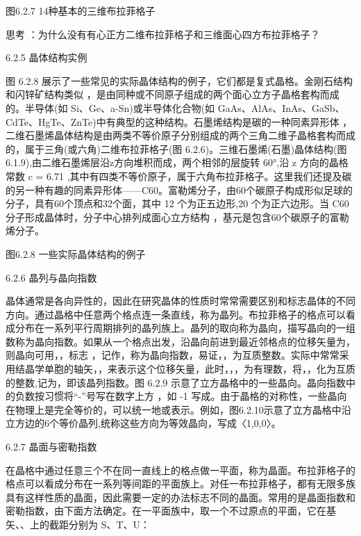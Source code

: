 图6.2.7 14种基本的三维布拉菲格子

思考 ：为什么没有有心正方二维布拉菲格子和三维面心四方布拉菲格子？



6.2.5 晶体结构实例

图 6.2.8 展示了一些常见的实际晶体结构的例子，它们都是复式晶格。金刚石结构和闪锌矿结构类似 ，是由同种或不同原子组成的两个面心立方子晶格套构而成的。半导体(如 Si、Ge、a-Sn)或半导体化合物(如 GaAs、AlAs、InAs、GaSb、CdTe、HgTe、ZnTe)中有典型的这种结构。石墨烯结构是碳的一种同素异形体 ，二维石墨烯晶体结构是由两类不等价原子分别组成的两个三角二维子晶格套构而成的，属于三角(或六角)二维布拉菲格子(图 6.2.6)。三维石墨烯(石墨)晶体结构(图 6.1.9),由二维石墨烯层沿z方向堆积而成，两个相邻的层旋转 60°,沿 z 方向的晶格常数 c = 6.71 ,其中有四类不等价原子，属于六角布拉菲格子。这里我们还提及碳的另一种有趣的同素异形体——C60。富勒烯分子，由60个碳原子构成形似足球的分子，具有60个顶点和32个面，其中 12 个为正五边形,20 个为正六边形。当 C60分子形成晶体时，分子中心排列成面心立方结构 ，基元是包含60个碳原子的富勒烯分子。



图6.2.8 一些实际晶体结构的例子



6.2.6 晶列与晶向指数

晶体通常是各向异性的，因此在研究晶体的性质时常常需要区别和标志晶体的不同方向。通过晶格中任意两个格点连一条直线，称为晶列。布拉菲格子的格点可以看成分布在一系列平行周期排列的晶列族上。晶列的取向称为晶向，描写晶向的一组数称为晶向指数。如果从一个格点出发，沿晶向前进到最近邻格点的位移矢量为，则晶向可用，，标志 ，记作，称为晶向指数，易证，，为互质整数。实际中常常采用结晶学单胞的轴矢，，来表示这个位移矢量，此时，，，为有理数，将，，化为互质的整数,记为，即该晶列指数。图 6.2.9 示意了立方晶格中的一些晶向。晶向指数中的负数按习惯将“-”号写在数字上方 ，如 -1 写成。由于晶格的对称性，一些晶向在物理上是完全等价的，可以统一地或表示。例如，图6.2.10示意了立方晶格中沿立方边的6个等价晶列,统称这些方向为等效晶向，写成〈1,0,0〉。





6.2.7 晶面与密勒指数

在晶格中通过任意三个不在同一直线上的格点做一平面，称为晶面。布拉菲格子的格点可以看成分布在一系列等间距的平面族上。对任一布拉菲格子，都有无限多族具有这样性质的晶面，因此需要一定的办法标志不同的晶面。常用的是晶面指数和密勒指数，由下面方法确定。在一平面族中，取一个不过原点的平面，它在基矢、、上的截距分别为 S、T、U：



